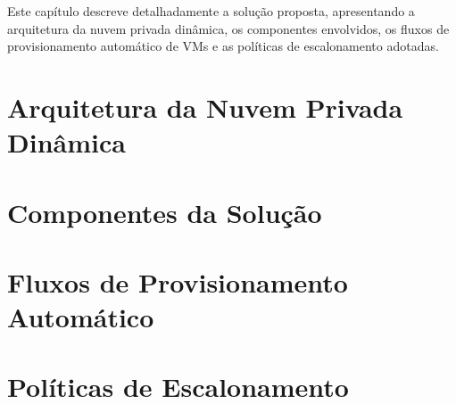 Este capítulo descreve detalhadamente a solução proposta, apresentando a arquitetura da nuvem privada dinâmica, os componentes envolvidos, os fluxos de provisionamento automático de VMs e as políticas de escalonamento adotadas.

\section{Arquitetura da Nuvem Privada Dinâmica}

\section{Componentes da Solução}

\section{Fluxos de Provisionamento Automático}

\section{Políticas de Escalonamento}
